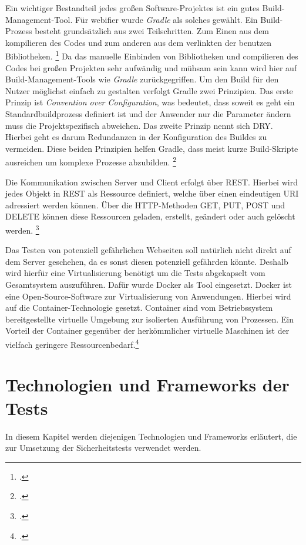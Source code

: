 Ein wichtiger Bestandteil jedes großen Software-Projektes ist ein gutes Build-Management-Tool. Für webifier wurde \textit{Gradle} als solches gewählt. Ein Build-Prozess besteht grundsätzlich aus zwei Teilschritten. Zum Einen aus dem kompilieren des Codes und zum anderen aus dem verlinkten der benutzen Bibliotheken. \footcite[Vgl.][]{buildprozess}
Da das manuelle Einbinden von Bibliotheken und compilieren des Codes bei großen Projekten sehr aufwändig und mühsam sein kann wird hier auf Build-Management-Tools wie \textit{Gradle} zurückgegriffen. Um den Build für den Nutzer möglichst einfach zu gestalten verfolgt Gradle zwei Prinzipien. Das erste Prinzip ist \textit{Convention over Configuration}, was bedeutet, dass soweit es geht ein Standardbuildprozess definiert ist und der Anwender nur die Parameter ändern muss die Projektspezifisch abweichen. Das zweite Prinzip nennt sich \ac{DRY}. Hierbei geht es darum Redundanzen in der Konfiguration des Buildes zu vermeiden. Diese beiden Prinzipien helfen Gradle, dass meist kurze Build-Skripte ausreichen um komplexe Prozesse abzubilden. \footcite[Vgl.][6f]{gradle}

Die Kommunikation zwischen Server und Client erfolgt über \ac{REST}. Hierbei wird jedes Objekt in \ac{REST} als Ressource definiert, welche über einen eindeutigen \ac{URI} adressiert werden können. Über die HTTP-Methoden GET, PUT, POST und DELETE können diese Ressourcen geladen, erstellt, geändert oder auch gelöscht werden. \footcite[Vgl.][]{rest}

Das Testen von potenziell gefährlichen Webseiten soll natürlich nicht direkt auf dem Server geschehen, da es sonst diesen potenziell gefährden könnte. Deshalb wird hierfür eine Virtualisierung benötigt um die Tests abgekapselt vom Gesamtsystem auszuführen. Dafür wurde Docker als Tool eingesetzt. Docker ist eine Open-Source-Software zur Virtualisierung von Anwendungen. Hierbei wird auf die Container-Technologie gesetzt. Container sind vom Betriebssystem bereitgestellte virtuelle Umgebung zur isolierten Ausführung von Prozessen. Ein Vorteil der Container gegenüber der herkömmlicher virtuelle Maschinen ist der vielfach geringere Ressourcenbedarf.\footcite[Vgl.][]{docker}

\section{Technologien und Frameworks der Tests}


In diesem Kapitel werden diejenigen Technologien und Frameworks erläutert, die zur Umsetzung der Sicherheitstests verwendet werden.

